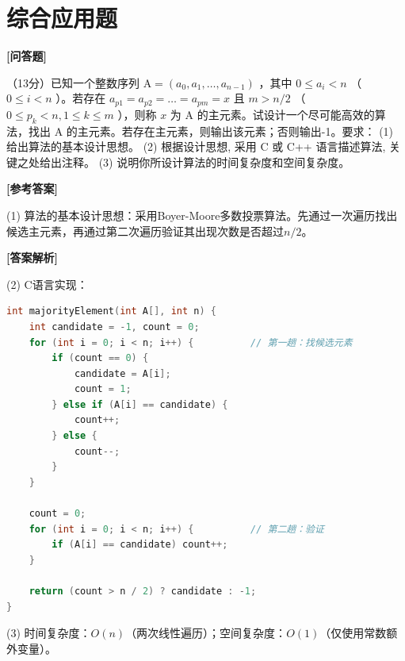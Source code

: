 \documentclass[12pt,a4paper]{article}
\newenvironment{choicequestion}[1][]{%
    \vspace{0.5cm}
    \noindent\textbf{[#1]}
    \vspace{0.2cm}
}{}
\newenvironment{answersection}{%
    \vspace{0.2cm}
    \noindent\textbf{[参考答案]}\\
    \vspace{0.1cm}
}{}
\newenvironment{analysissection}{%
    \vspace{0.2cm}
    \noindent\textbf{[答案解析]}\\
    \vspace{0.1cm}
}{}
\newcounter{questioncounter}
\newcounter{questioncounter}
\newcommand{\question}[2]{%
    \stepcounter{questioncounter}%
    \noindent\textbf{\thequestioncounter} #1%
}
\begin{document}
\section{综合应用题}

\begin{choicequestion}[问答题]
\question{（13分）已知一个整数序列 $\mathrm{A} = (a_{0}, a_{1}, \dots, a_{n - 1})$ ，其中 $0 \leqslant a_{i} < n$ （ $0 \leqslant i < n$ ）。若存在 $a_{p1} = a_{p2} = \dots = a_{pm} = x$ 且 $m > n / 2$ （ $0 \leqslant p_{k} < n, 1 \leqslant k \leqslant m$ ），则称 $x$ 为 A 的主元素。试设计一个尽可能高效的算法，找出 A 的主元素。若存在主元素，则输出该元素；否则输出-1。要求：\newline
(1) 给出算法的基本设计思想。  \newline
(2) 根据设计思想, 采用 C 或 C++ 语言描述算法, 关键之处给出注释。  \newline
(3) 说明你所设计算法的时间复杂度和空间复杂度。}{}

\begin{answersection}
(1) 算法的基本设计思想：采用Boyer-Moore多数投票算法。先通过一次遍历找出候选主元素，再通过第二次遍历验证其出现次数是否超过$n/2$。
\end{answersection}

\begin{analysissection}
(2) C语言实现：
\begin{lstlisting}[language=C]
int majorityElement(int A[], int n) {
    int candidate = -1, count = 0;
    for (int i = 0; i < n; i++) {          // 第一趟：找候选元素
        if (count == 0) {
            candidate = A[i];
            count = 1;
        } else if (A[i] == candidate) {
            count++;
        } else {
            count--;
        }
    }
    
    count = 0;
    for (int i = 0; i < n; i++) {          // 第二趟：验证
        if (A[i] == candidate) count++;
    }
    
    return (count > n / 2) ? candidate : -1;
}
\end{lstlisting}

(3) 时间复杂度：$O(n)$（两次线性遍历）；空间复杂度：$O(1)$（仅使用常数额外变量）。
\end{analysissection}
\end{choicequestion}
\end{document}
